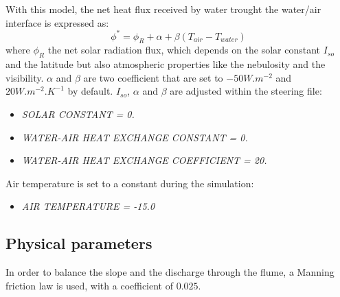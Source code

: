 With this model, the net heat flux received by water trought the water/air interface is expressed as:
\begin{equation}
\phi^* = \phi_R + \alpha + \beta (T_{air} - T_{water})
\end{equation}
where $\phi_R$ the net solar radiation flux, which depends on the solar constant $I_{so}$ and the latitude but
also atmospheric properties like the nebulosity and the visibility. $\alpha$ and $\beta$ are two coefficient that
are set to $-50W.m^{-2}$ and $20W.m^{-2}.K^{-1}$ by default. $I_{so}$, $\alpha$ and $\beta$ are adjusted within
the \khione steering file:
\begin{itemize}
	\item\textit{SOLAR CONSTANT = 0.}
	\item\textit{WATER-AIR HEAT EXCHANGE CONSTANT = 0.}
	\item\textit{WATER-AIR HEAT EXCHANGE COEFFICIENT = 20.}
\end{itemize}
Air temperature is set to a constant during the simulation:
\begin{itemize}
	\item\textit{AIR TEMPERATURE      = -15.0}
\end{itemize}

\subsection{Physical parameters}

In order to balance the slope and the discharge through the flume, a Manning friction law is used, with a coefficient of $0.025$.

